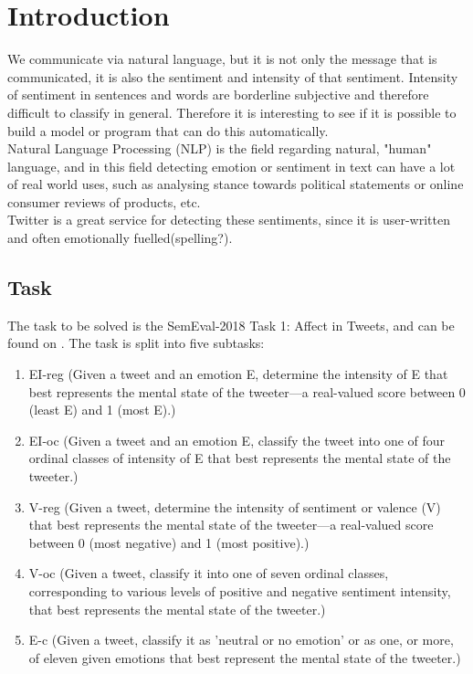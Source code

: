 \section{Introduction}
We communicate via natural language, but it is not only the message that is communicated, it is also the sentiment and intensity of that sentiment. Intensity of sentiment in sentences and words are borderline subjective and therefore difficult to classify in general. Therefore it is interesting to see if it is possible to build a model or program that can do this automatically. \\
Natural Language Processing (NLP) is the field regarding natural, "human" language, and in this field detecting emotion or sentiment in text can have a lot of real world uses, such as analysing stance towards political statements or online consumer reviews of products, etc. \\
Twitter is a great service for detecting these sentiments, since it is user-written and often emotionally fuelled(spelling?).
\subsection{Task} \label{sec:task}
The task to be solved is the SemEval-2018 Task 1: Affect in Tweets, and can be found on \cite{codalab}. The task is split into five subtasks:\\
\begin{enumerate}
\item EI-reg (Given a tweet and an emotion E, determine the  intensity of E that best represents the mental state of the tweeter—a real-valued score between 0 (least E) and 1 (most E).)
\item EI-oc (Given a tweet and an emotion E, classify the tweet into one of four ordinal classes of intensity of E that best represents the mental state of the tweeter.)
\item V-reg (Given a tweet, determine the intensity of sentiment or valence (V) that best represents the mental state of the tweeter—a real-valued score between 0 (most negative) and 1 (most positive).)
\item V-oc (Given a tweet, classify it into one of seven ordinal classes, corresponding to various levels of positive and negative sentiment intensity, that best represents the mental state of the tweeter.)
\item E-c (Given a tweet, classify it as 'neutral or no emotion' or as one, or more, of eleven given emotions that best represent the mental state of the tweeter.)
\end{enumerate}
 
